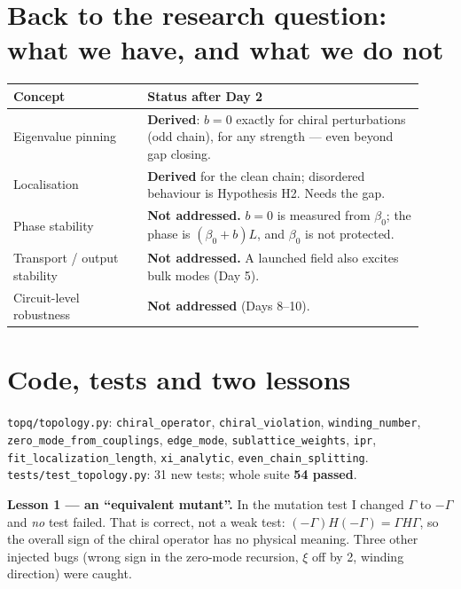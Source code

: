 \documentclass[10pt,a4paper]{article}
\begin{document}
\section{Back to the research question: what we have, and what we do not}
\begin{tabular}{@{}p{0.3\linewidth}p{0.62\linewidth}@{}}\toprule
Concept & Status after Day 2\\\midrule
Eigenvalue pinning & \textbf{Derived}: $b=0$ exactly for chiral perturbations (odd chain), for any strength --- even beyond gap closing.\\
Localisation & \textbf{Derived} for the clean chain; disordered behaviour is Hypothesis H2. Needs the gap.\\
Phase stability & \textbf{Not addressed.} $b=0$ is measured from $\beta_0$; the phase is $(\beta_0+b)L$, and $\beta_0$ is not protected.\\
Transport / output stability & \textbf{Not addressed.} A launched field also excites bulk modes (Day 5).\\
Circuit-level robustness & \textbf{Not addressed} (Days 8--10).\\\bottomrule
\end{tabular}

\section{Code, tests and two lessons}
\texttt{topq/topology.py}: \texttt{chiral\_operator}, \texttt{chiral\_violation}, \texttt{winding\_number}, \texttt{zero\_mode\_from\_couplings}, \texttt{edge\_mode}, \texttt{sublattice\_weights}, \texttt{ipr}, \texttt{fit\_localization\_length}, \texttt{xi\_analytic}, \texttt{even\_chain\_splitting}. \texttt{tests/test\_topology.py}: 31 new tests; whole suite \textbf{54 passed}.

\textbf{Lesson 1 --- an ``equivalent mutant''.} In the mutation test I changed $\Gamma$ to $-\Gamma$ and \emph{no} test failed. That is correct, not a weak test: $(-\Gamma)H(-\Gamma)=\Gamma H\Gamma$, so the overall sign of the chiral operator has no physical meaning. Three other injected bugs (wrong sign in the zero-mode recursion, $\xi$ off by 2, winding direction) were caught.
\end{document}
